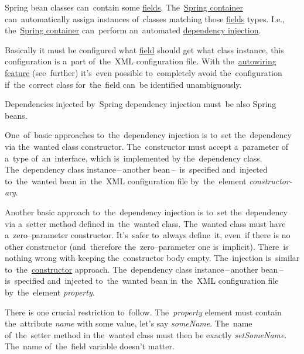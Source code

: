 \label{springdependencyinjection}
Spring bean classes can~contain some \hyperref[variablefieldproperty]{fields}.
The~\hyperref[springcontainrer]{Spring container} can~automatically assign instances of~classes matching those \hyperref[variablefieldproperty]{fields} types.
I.e., the~\hyperref[springcontainrer]{Spring container} can~perform an~automated \hyperref[dependencyinjection]{dependency injection}.

Basically it must be configured what \hyperref[variablefieldproperty]{field} should get what class instance, this configuration is a~part of~the~XML configuration file.
With the~\hyperref[autowiring]{autowiring feature} (see~further) it's~even possible to~completely avoid the~configuration if~the~correct class for~the~field can~be identified unambiguously.

\note Dependencies injected by~Spring dependency injection must~be also Spring beans.

\label{constructorinjection}
One~of~basic approaches to~the~dependency injection is to~set the~dependency via the~wanted class constructor.
The~constructor must accept a~parameter of a~type of~an~interface, which is~implemented by the~dependency class.
The~dependency class instance\,--\,another bean\,--\, is~specified and~injected to~the~wanted bean in~the~XML configuration file by~the~element \textit{constructor-arg}.

\label{setterinjection}
Another basic approach to~the~dependency injection is to~set the~dependency via a~setter method defined in~the~wanted class.
The~wanted class must have a~zero--parameter constructor.
It's~safer to~always define~it, even~if there is no other constructor (and~therefore the~zero--parameter one is~implicit).
There~is nothing wrong with keeping the~constructor body empty.
The~injection is~similar to~the~\hyperref[constructorinjection]{constructor} approach.
The~dependency class instance\,--\,another bean\,--\, is~specified and~injected to~the~wanted bean in~the~XML configuration file by~the~element \textit{property}.

\warning There is one crucial restriction to~follow.
The~\textit{property} element must contain the~attribute \textit{name} with some value, let's say \textit{someName}.
The~name of~the~setter method in the~wanted class must then be exactly \textit{setSomeName}.
The~name of~the~field variable doesn't matter.

